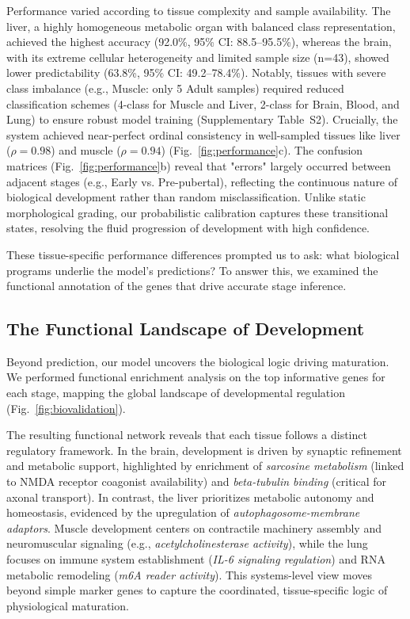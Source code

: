 Performance varied according to tissue complexity and sample availability. The liver, a highly homogeneous metabolic organ with balanced class representation, achieved the highest accuracy (92.0\%, 95\% CI: 88.5--95.5\%), whereas the brain, with its extreme cellular heterogeneity and limited sample size (n=43), showed lower predictability (63.8\%, 95\% CI: 49.2--78.4\%). Notably, tissues with severe class imbalance (e.g., Muscle: only 5 Adult samples) required reduced classification schemes (4-class for Muscle and Liver, 2-class for Brain, Blood, and Lung) to ensure robust model training (Supplementary Table~S2). Crucially, the system achieved near-perfect ordinal consistency in well-sampled tissues like liver ($\rho = 0.98$) and muscle ($\rho = 0.94$) (Fig.~\ref{fig:performance}c). The confusion matrices (Fig.~\ref{fig:performance}b) reveal that "errors" largely occurred between adjacent stages (e.g., Early vs. Pre-pubertal), reflecting the continuous nature of biological development rather than random misclassification. Unlike static morphological grading, our probabilistic calibration captures these transitional states, resolving the fluid progression of development with high confidence.

These tissue-specific performance differences prompted us to ask: what biological programs underlie the model's predictions? To answer this, we examined the functional annotation of the genes that drive accurate stage inference.

\subsection{The Functional Landscape of Development}

Beyond prediction, our model uncovers the biological logic driving maturation. We performed functional enrichment analysis on the top informative genes for each stage, mapping the global landscape of developmental regulation (Fig.~\ref{fig:biovalidation}).

The resulting functional network reveals that each tissue follows a distinct regulatory framework. In the brain, development is driven by synaptic refinement and metabolic support, highlighted by enrichment of \textit{sarcosine metabolism} (linked to NMDA receptor coagonist availability) and \textit{beta-tubulin binding} (critical for axonal transport). In contrast, the liver prioritizes metabolic autonomy and homeostasis, evidenced by the upregulation of \textit{autophagosome-membrane adaptors}. Muscle development centers on contractile machinery assembly and neuromuscular signaling (e.g., \textit{acetylcholinesterase activity}), while the lung focuses on immune system establishment (\textit{IL-6 signaling regulation}) and RNA metabolic remodeling (\textit{m6A reader activity}). This systems-level view moves beyond simple marker genes to capture the coordinated, tissue-specific logic of physiological maturation.

